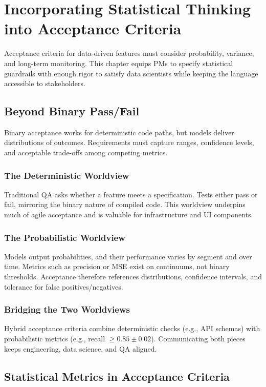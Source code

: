 \chapter{Incorporating Statistical Thinking into Acceptance Criteria}
\label{ch:statistical-acceptance}

Acceptance criteria for data-driven features must consider probability, variance, and long-term monitoring. This chapter equips PMs to specify statistical guardrails with enough rigor to satisfy data scientists while keeping the language accessible to stakeholders.

\section{Beyond Binary Pass/Fail}
\label{sec:beyond-binary}

Binary acceptance works for deterministic code paths, but models deliver distributions of outcomes. Requirements must capture ranges, confidence levels, and acceptable trade-offs among competing metrics.

\subsection{The Deterministic Worldview}
Traditional QA asks whether a feature meets a specification. Tests either pass or fail, mirroring the binary nature of compiled code. This worldview underpins much of agile acceptance and is valuable for infrastructure and UI components.

\subsection{The Probabilistic Worldview}
Models output probabilities, and their performance varies by segment and over time. Metrics such as precision or MSE exist on continuums, not binary thresholds. Acceptance therefore references distributions, confidence intervals, and tolerance for false positives/negatives.

\subsection{Bridging the Two Worldviews}
Hybrid acceptance criteria combine deterministic checks (e.g., API schemas) with probabilistic metrics (e.g., recall $\ge 0.85 \pm 0.02$). Communicating both pieces keeps engineering, data science, and QA aligned.

\section{Statistical Metrics in Acceptance Criteria}
\label{sec:statistical-metrics}

